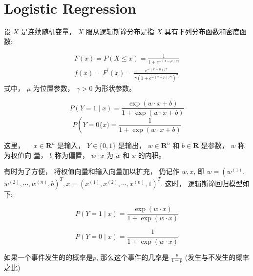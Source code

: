 \chapter{Logistic Regression}

\begin{definition}
    设 $ X $ 是连续随机变量， $ X $ 服从逻辑斯谛分布是指 $ X $ 具有下列分布函数和密度函数:

    \begin{equation}
\begin{array}{l}
F(x)=P(X \leqslant x)=\frac{1}{1+{e}^{-(x-\mu) / \gamma}} \\
f(x)=F^{\prime}(x)=\frac{{e}^{-(x-\mu) / \gamma}}{\gamma\left(1+{e}^{-(x-\mu) / \gamma}\right)^{2}}
\end{array}
\end{equation}
式中， $ \mu $ 为位置参数， $ \gamma>0 $ 为形状参数。
\end{definition}



\begin{definition}
    \begin{equation} P(Y=1 \mid x)=\frac{\exp (w \cdot x+b)}{1+\exp (w \cdot x+b)} \end{equation}
\begin{equation} P\left(Y=0\{x)=\frac{1}{1+\exp (w \cdot x+b)}\right. \end{equation}

这里， $\quad x \in \mathbf{R}^{n}$ 是输入， $Y \in\{0,1\}$ 是输出， $w \in \mathbf{R}^{n}$ 和 $b \in \mathbf{R}$ 是参数， $w$ 称为权值向 量， $b$ 称为偏置， $w \cdot x$ 为 $w$ 和 $x$ 的内积。
\end{definition}

有时为了方便， 将权值向量和输入向量加以扩充， 仍记作 $ w, x $, 即 $ w=\left(w^{(1)}\right. $, $ \left.w^{(2)}, \cdots, w^{(n)}, b\right)^{{T}}, x=\left(x^{(1)}, x^{(2)}, \cdots, x^{(n)}, 1\right)^{{T}} $. 这时， 逻辑斯谛回归模型如下:

\begin{equation} P(Y=1 \mid x)=\frac{\exp (w \cdot x)}{1+\exp (w \cdot x)} \end{equation}

\begin{equation} P(Y=0 \mid x)=\frac{1}{1+\exp (w \cdot x)} \end{equation}

\begin{definition}[几率]
    如果一个事件发生的的概率是$p$, 那么这个事件的几率是 $ \frac{p}{1-p} $ (发生与不发生的概率之比)
\end{definition}

